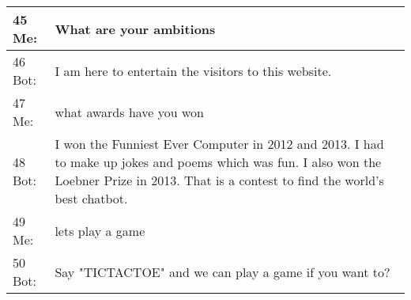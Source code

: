 \begin{longtable}{| p{} | p{} |}
	45 Me: & What are your ambitions \\ \hline
	46 Bot: & I am here to entertain the visitors to this website. \\ \hline
	47 Me: & what awards have you won \\ \hline
	48 Bot: & I won the Funniest Ever Computer in 2012 and 2013. I had to make up jokes and poems which was fun. I also won the Loebner Prize in 2013. That is a contest to find the world's best chatbot. \\ \hline
	49 Me: & lets play a game \\ \hline
	50 Bot: & Say "TICTACTOE" and we can play a game if you want to? \\ \hline
	
\end{longtable}
